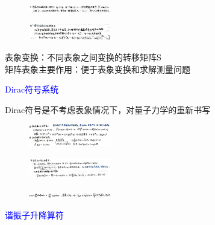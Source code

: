 \documentclass[a4paper,8pt]{extarticle} %
\newcommand{\bluetext}[1]{\textcolor{blue}{#1}}
\begin{document}
\begin{multicols}{3}
\begin{figure}[H]
    \vspace{-0.6cm}
    \centering
    \includegraphics[width=0.32\textwidth]{images/17.png}
    \vspace{-0.6cm}
\end{figure}
\begin{figure}[H]
    \centering
    \includegraphics[width=0.32\textwidth]{images/18.png}
    \vspace{-0.6cm}
\end{figure}
表象变换：不同表象之间变换的转移矩阵S\\
矩阵表象主要作用：便于表象变换和求解测量问题

\bluetext{Dirac符号系统}

Dirac符号是不考虑表象情况下，对量子力学的重新书写\\
\begin{figure}[H]
    \vspace{-0.5cm}
    \centering
    \includegraphics[width=0.32\textwidth]{images/19.png}
    \vspace{-0.6cm}
\end{figure}
\begin{figure}[H]
    \vspace{-0.5cm}
    \centering
    \includegraphics[width=0.32\textwidth]{images/20.png}
    \vspace{-0.6cm}
\end{figure}
\begin{figure}[H]
    \vspace{-0.5cm}
    \centering
    \includegraphics[width=0.32\textwidth]{images/21.png}
    \vspace{-0.6cm}
\end{figure}
\bluetext{谐振子升降算符}


\end{multicols}
\end{document}

